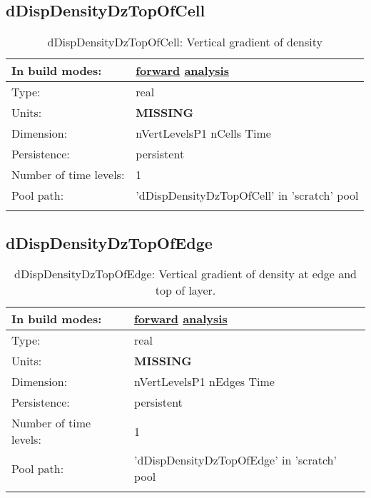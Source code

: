 \subsection[dDispDensityDzTopOfCell]{dDispDensityDzTopOfCell}
\label{subsec:var_sec_scratch_dDispDensityDzTopOfCell}
\begin{center}
\begin{longtable}{| p{2.0in} | p{4.0in} |}
        \hline 
        In build modes: & \hyperref[subsec:forward_var_tab_scratch]{forward} \hyperref[subsec:analysis_var_tab_scratch]{analysis} \\
        \hline 
        Type: & real \\
        \hline 
        Units: & {\bf \color{red} MISSING} \\
        \hline 
        Dimension: & nVertLevelsP1 nCells Time \\
        \hline 
        Persistence: & persistent \\
        \hline 
        Number of time levels: & 1 \\
        \hline 
            Pool path: & 'dDispDensityDzTopOfCell' in 'scratch' pool
 \\
		 \hline 
    \caption{dDispDensityDzTopOfCell: Vertical gradient of density}
\end{longtable}
\end{center}
\subsection[dDispDensityDzTopOfEdge]{dDispDensityDzTopOfEdge}
\label{subsec:var_sec_scratch_dDispDensityDzTopOfEdge}
\begin{center}
\begin{longtable}{| p{2.0in} | p{4.0in} |}
        \hline 
        In build modes: & \hyperref[subsec:forward_var_tab_scratch]{forward} \hyperref[subsec:analysis_var_tab_scratch]{analysis} \\
        \hline 
        Type: & real \\
        \hline 
        Units: & {\bf \color{red} MISSING} \\
        \hline 
        Dimension: & nVertLevelsP1 nEdges Time \\
        \hline 
        Persistence: & persistent \\
        \hline 
        Number of time levels: & 1 \\
        \hline 
            Pool path: & 'dDispDensityDzTopOfEdge' in 'scratch' pool
 \\
		 \hline 
    \caption{dDispDensityDzTopOfEdge: Vertical gradient of density at edge and top of layer.}
\end{longtable}
\end{center}
